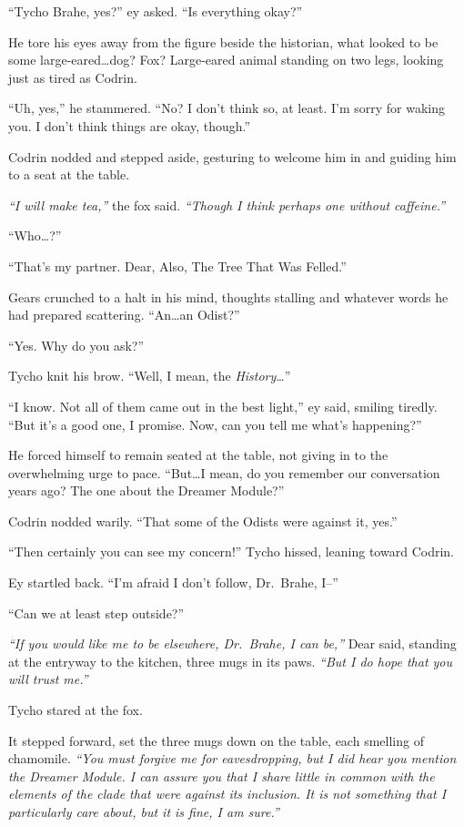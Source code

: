 ``Tycho Brahe, yes?'' ey asked. ``Is everything okay?''

He tore his eyes away from the figure beside the historian, what looked to be some large-eared\ldots{}dog? Fox? Large-eared animal standing on two legs, looking just as tired as Codrin.

``Uh, yes,'' he stammered. ``No? I don't think so, at least. I'm sorry for waking you. I don't think things are okay, though.''

Codrin nodded and stepped aside, gesturing to welcome him in and guiding him to a seat at the table.

\emph{``I will make tea,''} the fox said. \emph{``Though I think perhaps one without caffeine.''}

``Who\ldots{}?''

``That's my partner. Dear, Also, The Tree That Was Felled.''

Gears crunched to a halt in his mind, thoughts stalling and whatever words he had prepared scattering. ``An\ldots an Odist?''

``Yes. Why do you ask?''

Tycho knit his brow. ``Well, I mean, the \emph{History}\ldots{}''

``I know. Not all of them came out in the best light,'' ey said, smiling tiredly. ``But it's a good one, I promise. Now, can you tell me what's happening?''

He forced himself to remain seated at the table, not giving in to the overwhelming urge to pace. ``But\ldots I mean, do you remember our conversation years ago? The one about the Dreamer Module?''

Codrin nodded warily. ``That some of the Odists were against it, yes.''

``Then certainly you can see my concern!'' Tycho hissed, leaning toward Codrin.

Ey startled back. ``I'm afraid I don't follow, Dr.~Brahe, I--''

``Can we at least step outside?''

\emph{``If you would like me to be elsewhere, Dr.~Brahe, I can be,''} Dear said, standing at the entryway to the kitchen, three mugs in its paws. \emph{``But I do hope that you will trust me.''}

Tycho stared at the fox.

It stepped forward, set the three mugs down on the table, each smelling of chamomile. \emph{``You must forgive me for eavesdropping, but I did hear you mention the Dreamer Module. I can assure you that I share little in common with the elements of the clade that were against its inclusion. It is not something that I particularly care about, but it is fine, I am sure.''}

